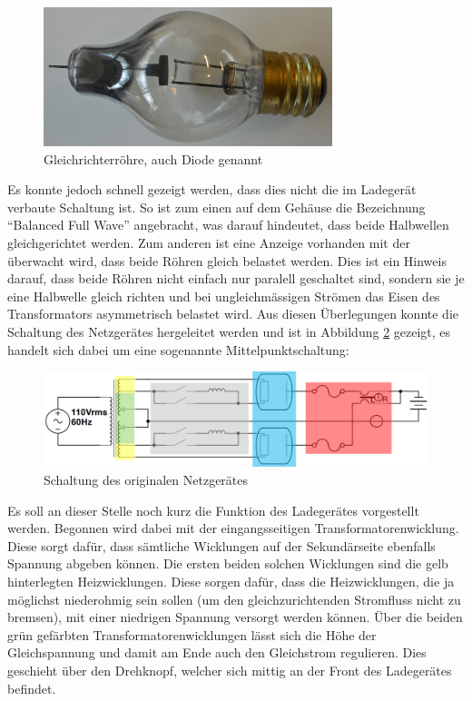 \begin{figure}[h]
	\centering
		\includegraphics[width=0.75\textwidth]{images/Roehre_Diode.jpg}
	\caption{Gleichrichterröhre, auch Diode genannt}
	\label{fig:Roehre_Diode}
\end{figure}

Es konnte jedoch schnell gezeigt werden, dass dies nicht die im Ladegerät verbaute Schaltung ist. So ist zum einen auf dem Gehäuse die Bezeichnung "`Balanced Full Wave"' angebracht, was darauf hindeutet, dass beide Halbwellen gleichgerichtet werden. Zum anderen ist eine Anzeige vorhanden mit der überwacht wird, dass beide Röhren gleich belastet werden. Dies ist ein Hinweis darauf, dass beide Röhren nicht einfach nur paralell geschaltet sind, sondern sie je eine Halbwelle gleich richten und bei ungleichmässigen Strömen das Eisen des Transformators asymmetrisch belastet wird. Aus diesen Überlegungen konnte die Schaltung des Netzgerätes hergeleitet werden und ist in Abbildung \ref{fig:Schema_Ladegeraet_Alt} gezeigt, es handelt sich dabei um eine sogenannte Mittelpunktschaltung:

\begin{figure}[h]
	\centering
		\includegraphics[width=1.00\textwidth]{images/Ladegeraet_Alt_2.PNG}
	\caption{Schaltung des originalen Netzgerätes}
	\label{fig:Schema_Ladegeraet_Alt}
\end{figure}

Es soll an dieser Stelle noch kurz die Funktion des Ladegerätes vorgestellt werden. Begonnen wird dabei mit der eingangsseitigen Transformatorenwicklung. Diese sorgt dafür, dass sämtliche Wicklungen auf der Sekundärseite ebenfalls Spannung abgeben können. Die ersten beiden solchen Wicklungen sind die gelb hinterlegten Heizwicklungen. Diese sorgen dafür, dass die Heizwicklungen, die ja möglichst niederohmig sein sollen (um den gleichzurichtenden Stromfluss nicht zu bremsen), mit einer niedrigen Spannung versorgt werden können. Über die beiden grün gefärbten Transformatorenwicklungen lässt sich die Höhe der Gleichspannung und damit am Ende auch den Gleichstrom regulieren. Dies geschieht über den Drehknopf, welcher sich mittig an der Front des Ladegerätes befindet.

